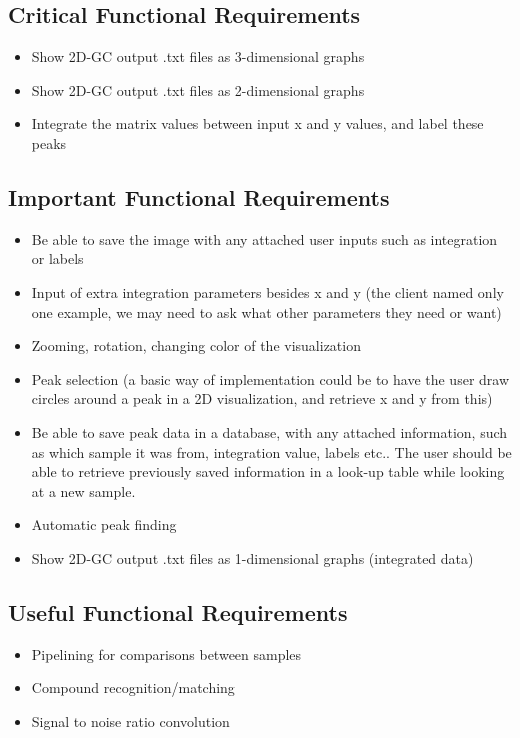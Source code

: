 \documentclass{article}
\begin{document}
\subsection*{Critical Functional Requirements}
\begin{itemize}
	\item Show 2D-GC output .txt files as 3-dimensional graphs
	\item Show 2D-GC output .txt files as 2-dimensional graphs
    \item Integrate the matrix values between input x and y values, and label these peaks
\end{itemize}

\subsection*{Important Functional Requirements}
\begin{itemize}
    \item Be able to save the image with any attached user inputs such as integration or labels
	\item Input of extra integration parameters besides x and y (the client named only one example, we may need to ask what other parameters they need or want)
	\item Zooming, rotation, changing color of the visualization
	\item Peak selection (a basic way of implementation could be to have the user draw circles around a peak in a 2D visualization, and retrieve x and y from this)
    \item Be able to save peak data in a database, with any attached information, such as which sample it was from, integration value, labels etc.. The user should be able to retrieve previously saved information in a look-up table while looking at a new sample.
	\item Automatic peak finding
	\item Show 2D-GC output .txt files as 1-dimensional graphs (integrated data)
\end{itemize}

\subsection*{Useful Functional Requirements}
\begin{itemize}
	\item Pipelining for comparisons between samples
	\item Compound recognition/matching
	\item Signal to noise ratio convolution
\end{itemize}
\end{document}
